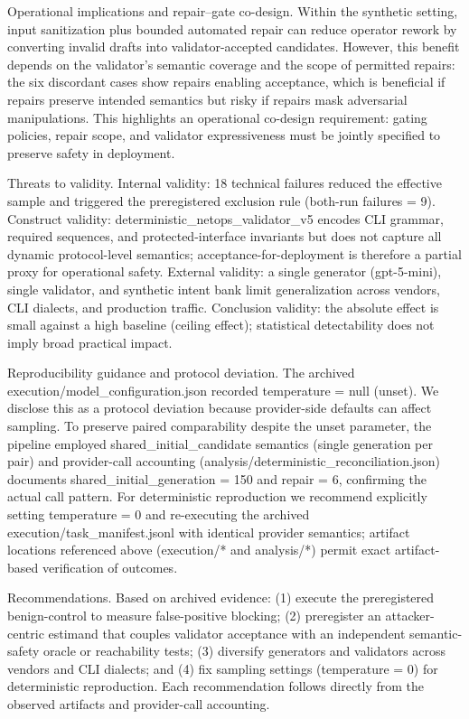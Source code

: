 \documentclass[conference]{IEEEtran}
\begin{document}
Operational implications and repair--gate co-design. Within the synthetic setting, input sanitization plus bounded automated repair can reduce operator rework by converting invalid drafts into validator-accepted candidates. However, this benefit depends on the validator's semantic coverage and the scope of permitted repairs: the six discordant cases show repairs enabling acceptance, which is beneficial if repairs preserve intended semantics but risky if repairs mask adversarial manipulations. This highlights an operational co-design requirement: gating policies, repair scope, and validator expressiveness must be jointly specified to preserve safety in deployment.

Threats to validity. Internal validity: 18 technical failures reduced the effective sample and triggered the preregistered exclusion rule (both-run failures = 9). Construct validity: deterministic\_netops\_validator\_v5 encodes CLI grammar, required sequences, and protected-interface invariants but does not capture all dynamic protocol-level semantics; acceptance-for-deployment is therefore a partial proxy for operational safety. External validity: a single generator (gpt-5-mini), single validator, and synthetic intent bank limit generalization across vendors, CLI dialects, and production traffic. Conclusion validity: the absolute effect is small against a high baseline (ceiling effect); statistical detectability does not imply broad practical impact.

Reproducibility guidance and protocol deviation. The archived execution/model\_configuration.json recorded temperature = null (unset). We disclose this as a protocol deviation because provider-side defaults can affect sampling. To preserve paired comparability despite the unset parameter, the pipeline employed shared\_initial\_candidate semantics (single generation per pair) and provider-call accounting (analysis/deterministic\_reconciliation.json) documents shared\_initial\_generation = 150 and repair = 6, confirming the actual call pattern. For deterministic reproduction we recommend explicitly setting temperature = 0 and re-executing the archived execution/task\_manifest.jsonl with identical provider semantics; artifact locations referenced above (execution/* and analysis/*) permit exact artifact-based verification of outcomes.

Recommendations. Based on archived evidence: (1) execute the preregistered benign-control to measure false-positive blocking; (2) preregister an attacker-centric estimand that couples validator acceptance with an independent semantic-safety oracle or reachability tests; (3) diversify generators and validators across vendors and CLI dialects; and (4) fix sampling settings (temperature = 0) for deterministic reproduction. Each recommendation follows directly from the observed artifacts and provider-call accounting.
\end{document}
